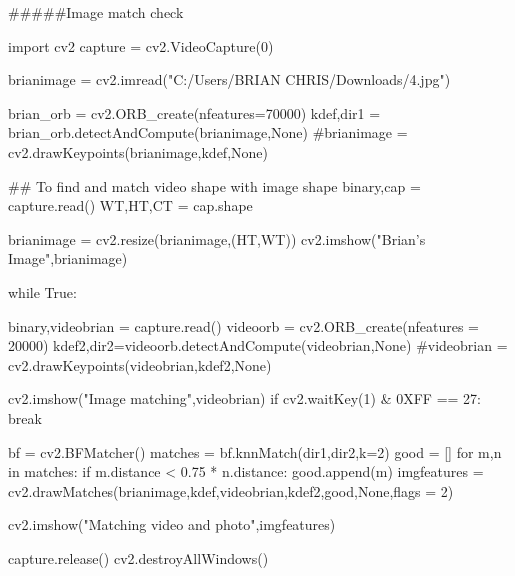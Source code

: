 #####Image match check


import cv2
capture = cv2.VideoCapture(0)

brianimage = cv2.imread("C:/Users/BRIAN CHRIS/Downloads/4.jpg")

brian_orb = cv2.ORB_create(nfeatures=70000)
kdef,dir1 = brian_orb.detectAndCompute(brianimage,None)
#brianimage = cv2.drawKeypoints(brianimage,kdef,None)

## To find and match video shape with image shape
binary,cap = capture.read()
WT,HT,CT = cap.shape

brianimage = cv2.resize(brianimage,(HT,WT))
cv2.imshow("Brian's Image",brianimage)


while True:
    
    
    binary,videobrian = capture.read()
    videoorb = cv2.ORB_create(nfeatures = 20000)
    kdef2,dir2=videoorb.detectAndCompute(videobrian,None)
    #videobrian = cv2.drawKeypoints(videobrian,kdef2,None)
    
    
    cv2.imshow("Image matching",videobrian)
    if cv2.waitKey(1) & 0XFF == 27:
                break

    bf = cv2.BFMatcher()
    matches = bf.knnMatch(dir1,dir2,k=2)
    good = []
    for m,n in matches:
        if m.distance < 0.75 * n.distance:
            good.append(m)
    imgfeatures = cv2.drawMatches(brianimage,kdef,videobrian,kdef2,good,None,flags = 2)
    
    cv2.imshow("Matching video and photo",imgfeatures)
        
        
        
capture.release()
cv2.destroyAllWindows()